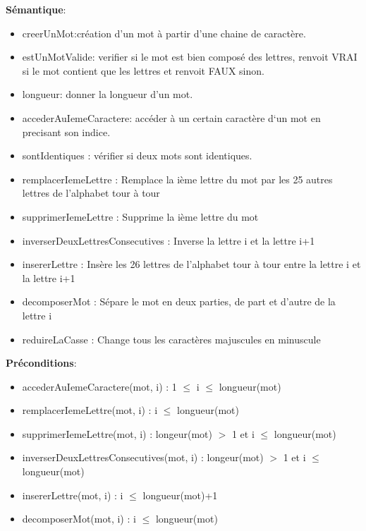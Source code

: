 \documentclass{article}
\begin{document}
    \textbf{Sémantique}: \begin{itemize}[label=$\- $, leftmargin=2cm, itemsep=0cm]
      \item creerUnMot:création d’un mot à partir d’une chaine de caractère.
        \item estUnMotValide: verifier si le mot est bien composé des lettres, renvoit VRAI si le mot contient que les lettres et renvoit FAUX sinon.
        \item longueur: donner la longueur d’un mot.
        \item accederAuIemeCaractere: accéder à un certain caractère d`un mot en precisant son indice.
         \item sontIdentiques : vérifier si deux mots sont identiques.
                 \item remplacerIemeLettre : Remplace la ième lettre du mot par les 25 autres lettres de l'alphabet tour à tour
        \item supprimerIemeLettre : Supprime la ième lettre du mot
        \item inverserDeuxLettresConsecutives : Inverse la lettre i et la lettre i+1
        \item insererLettre : Insère les 26 lettres de l'alphabet tour à tour entre la lettre i et la lettre i+1
        \item decomposerMot : Sépare le mot en deux parties, de part et d'autre de la lettre i
        \item reduireLaCasse : Change tous les caractères majuscules en minuscule
    \end{itemize}

    \textbf{Préconditions}: \begin{itemize}[label=$\- $, leftmargin=2cm, itemsep=0cm]
        \item accederAuIemeCaractere(mot, i) : 1 $\leq$ i $\leq$ longueur(mot)
                \item remplacerIemeLettre(mot, i) : i $\leq$ longueur(mot)
        \item supprimerIemeLettre(mot, i) : longeur(mot) $>$ 1 et i $\leq$ longueur(mot)
        \item inverserDeuxLettresConsecutives(mot, i) : longeur(mot) $>$ 1 et i $\leq$ longueur(mot)
        \item insererLettre(mot, i) : i $\leq$ longueur(mot)+1
        \item decomposerMot(mot, i) : i $\leq$ longueur(mot)
    \end{itemize}
\end{document}
